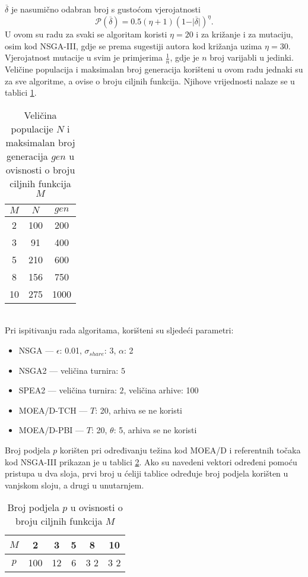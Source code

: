 \documentclass[times, utf8, zavrsni, numeric]{fer}
\begin{document}
$\overline{\delta}$ je nasumično odabran broj s gustoćom vjerojatnosti
\begin{equation*}
\mathcal{P}(\overline{\delta}) = 0.5(\eta + 1)(1 - \vert\overline{\delta}\vert)^{\eta}.
\end{equation*}
U ovom su radu za svaki se algoritam koristi $\eta = 20$ i za križanje i za mutaciju, osim kod NSGA-III, gdje se prema sugestiji autora kod križanja uzima $\eta = 30$. Vjerojatnost mutacije u svim je primjerima $\frac{1}{n}$, gdje je $n$ broj varijabli u jedinki.\\
Veličine populacija i maksimalan broj generacija korišteni u ovom radu jednaki su za sve algoritme, a ovise o broju ciljnih funkcija. Njihove vrijednosti nalaze se u tablici \ref{tbl:maxGen_N}.
\begin{table}[htb]
\caption{Veličina populacije $N$ i maksimalan broj generacija $gen$ u ovisnosti o broju ciljnih funkcija $M$}
\label{tbl:maxGen_N}
\centering
\begin{tabular}{ccc} \hline
$M$ & $N$ & $gen$\\ \hline
2 & 100 & 200\\
3 & 91 & 400 \\
5 & 210 & 600 \\ 
8 & 156 & 750 \\
10 & 275 & 1000 \\ \hline
\end{tabular}
\end{table}\\
Pri ispitivanju rada algoritama, korišteni su sljedeći parametri:
\begin{itemize}
\item NSGA --- $\epsilon$: 0.01, $\sigma_{share}$: 3, $\alpha$: 2
\item NSGA2 --- veličina turnira: $5$
\item SPEA2 --- veličina turnira: $2$, veličina arhive: 100
\item MOEA/D-TCH --- $T$: 20, arhiva se ne koristi
\item MOEA/D-PBI --- $T$: 20, $\theta$: 5, arhiva se ne koristi 
\end{itemize} 
Broj podjela $p$ korišten pri određivanju težina kod MOEA/D i referentnih točaka kod NSGA-III prikazan je u tablici \ref{tbl:ref_points}. Ako su navedeni vektori određeni pomoću pristupa u dva sloja, prvi broj u ćeliji tablice određuje broj podjela korišten u vanjskom sloju, a drugi u unutarnjem. \\  
\begin{table}[htb]
\caption{Broj podjela $p$ u ovisnosti o broju ciljnih funkcija $M$}
\label{tbl:ref_points}
\centering
\begin{tabular}{cccccc} \hline
$M$ & 2 & 3 & 5 & 8 & 10 \\ \hline
$p$ & 100 & 12 & 6 & 3 2 & 3 2\\ \hline

\end{tabular}
\end{table} \\
\end{document}
